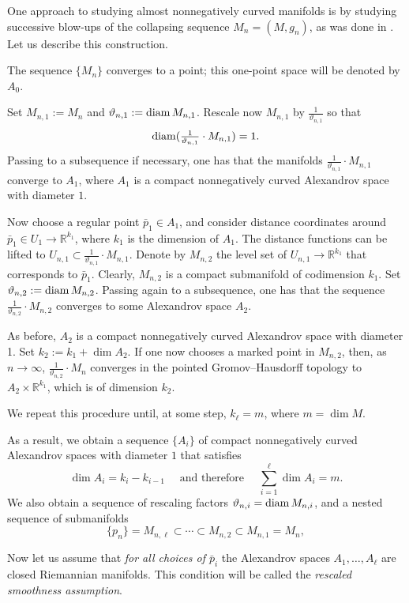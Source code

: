 \documentclass{amsart}
\begin{document}
One approach to studying almost nonnegatively curved manifolds is by studying successive blow-ups of the collapsing sequence $M_n=(M,g_n)$, as was done in \cite[Section 4.3]{KPT}.
Let us describe this construction.

The sequence $\{M_n\}$ converges to a point; this one-point space will be denoted by $A_0$.

Set $M_{n,1}:=M_n$ and $\vartheta_{n,1}:=\operatorname{\rm diam} M_{n,1}$.
Rescale now $M_{n,1}$ by $\tfrac{1}{\vartheta_{n,1}}$
so that 
\[\operatorname{\rm diam}(\tfrac{1}{\vartheta_{n,1}}\cdot M_{n,1})=1.\]
Passing to a subsequence if necessary, one has
that the manifolds $\frac{1}{\vartheta_{n,1}}{\cdot} M_{n,1}$
converge to $A_1$,
where $A_1$
is a compact nonnegatively curved Alexandrov space with diameter $1$.

Now choose a regular point $\bar p_1\in A_1$,
and consider distance coordinates around $\bar p_1\in U_1\to \mathbb{R}^{k_1}$,
where $k_1$ is the dimension of $A_1$.
The distance functions can be lifted
to $U_{n,1}\subset \frac{1}{\vartheta_{n,1}}{\cdot} M_{n,1}$.
Denote by $M_{n,2}$ the level set of $U_{n,1}\to \mathbb{R}^{k_1}$ that corresponds to $\bar p_1$.
Clearly, $M_{n,2}$ is a compact submanifold of codimension $k_1$.
Set $\vartheta_{n,2}:=\operatorname{\rm diam} M_{n,2}$.
Passing again to a subsequence, one has
that the sequence $\frac{1}{\vartheta_{n,2}}{\cdot} M_{n,2}$
converges to some  Alexandrov space $A_2$.

As before, $A_2$ is a compact nonnegatively curved Alexandrov space with diameter 1.
Set $k_2:=k_1+\dim A_2$.
If one now chooses a marked point in $M_{n,2}$,
then, as $n\to\infty$,
$\frac{1}{\vartheta_{n,2}}{\cdot} M_{n}$ converges 
in the pointed Gromov--Hausdorff topology
to $A_2\times\mathbb{R}^{k_1}$,
which is of dimension $k_2$.

We repeat this procedure until, at some step, $k_\ell=m$, where $m=\dim M$.

\medskip

As a result, we obtain a sequence $\{A_i\}$ of compact nonnegatively curved Alexandrov spaces
with diameter $1$ that satisfies
$$\dim A_i=k_i-k_{i-1} 
\quad\text{ and therefore }\quad
\sum_{i=1}^\ell\dim A_i=m.$$
We also obtain
a sequence of rescaling factors $\vartheta_{n,i}=\operatorname{\rm diam} M_{n,i}$,
and  a nested sequence of submanifolds
$$\{p_n\}=M_{n,\ell}\subset \cdots \subset M_{n,2}\subset M_{n,1}=M_n,$$

Now let us assume that \emph{for all choices of $\bar p_i$}
the Alexandrov spaces $A_1,\dots, A_\ell$ are closed  Riemannian manifolds.
This condition will be called the \emph{rescaled smoothness assumption}.
\end{document}
